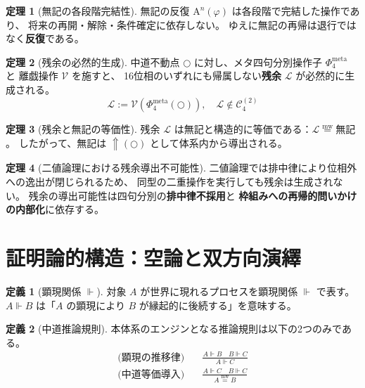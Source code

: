 \documentclass[11pt,a4paper]{ltjsarticle}
\newcommand{\mweq}{\mathrel{\overset{\mathrm{mw}}{=}}}
\newcommand{\metanegation}{\Uparrow}
\newcommand{\dfix}{\bigcirc}
\newcommand{\Phifour}{\Phi_{4}}
\theoremstyle{definition}
\newtheorem{definition}{定義}[section]
\newtheorem{theorem}{定理}[section]
\begin{document}
\begin{theorem}[無記の各段階完結性]
無記の反復 $\mathrm{A}^n(\varphi)$ は各段階で完結した操作であり、
将来の再開・解除・条件確定に依存しない。
ゆえに無記の再帰は退行ではなく\textbf{反復}である。
\end{theorem}

\begin{theorem}[残余の必然的生成]
中道不動点 $\dfix$ に対し、メタ四句分別操作子 $\Phifour^{\mathrm{meta}}$ と
離戯操作 $\mathcal{V}$ を施すと、
16位相のいずれにも帰属しない\textbf{残余} $\mathcal{L}$ が必然的に生成される。
\[
\mathcal{L} := \mathcal{V}(\Phifour^{\mathrm{meta}}(\dfix)),\quad
\mathcal{L} \notin \mathcal{C}_4^{(2)}
\]
\end{theorem}

\begin{theorem}[残余と無記の等価性]
残余 $\mathcal{L}$ は無記と構造的に等価である：$\mathcal{L} \mweq \text{無記}$。
したがって、無記は $\metanegation(\dfix)$ として体系内から導出される。
\end{theorem}

\begin{theorem}[二値論理における残余導出不可能性]
二値論理では排中律により位相外への逸出が閉じられるため、
同型の二重操作を実行しても残余は生成されない。
残余の導出可能性は四句分別の\textbf{排中律不採用}と
\textbf{枠組みへの再帰的問いかけの内部化}に依存する。
\end{theorem}

\section{証明論的構造：空論と双方向演繹}

\begin{definition}[顕現関係 $\Vdash$]
対象 $A$ が世界に現れるプロセスを顕現関係 $\Vdash$ で表す。
$A \Vdash B$ は「$A$ の顕現により $B$ が縁起的に後続する」を意味する。
\end{definition}

\begin{definition}[中道推論規則]
本体系のエンジンとなる推論規則は以下の2つのみである。
\begin{align*}
\text{(顕現の推移律)}&\quad
\frac{A \Vdash B \quad B \Vdash C}{A \Vdash C} \\[6pt]
\text{(中道等価導入)}&\quad
\frac{A \Vdash C \quad B \Vdash C}{A \mweq B}
\end{align*}
\end{definition}
\end{document}
